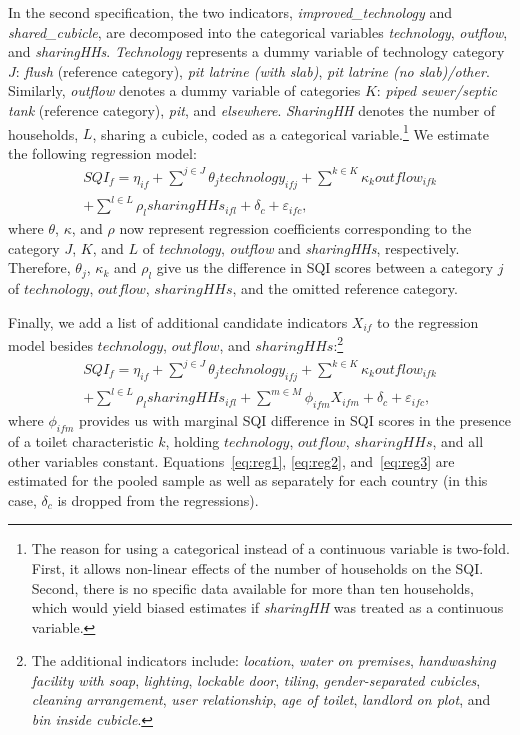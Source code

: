 \documentclass[natbib]{svjour3}                     %
\begin{document}
In the second specification, the two indicators, \textit{improved\_technology} and \textit{shared\_cubicle}, are decomposed into the categorical variables \textit{technology}, \textit{outflow}, and \textit{sharingHHs}. \textit{Technology} represents a dummy variable of technology category $J$: \textit{flush} (reference category), \textit{pit latrine (with slab)}, \textit{pit latrine (no slab)/other}. Similarly, \textit{outflow} denotes a dummy variable of categories $K$: \textit{piped sewer/septic tank} (reference category), \textit{pit}, and \textit{elsewhere}. \textit{SharingHH} denotes the number of households, $L$, sharing a cubicle, coded as a categorical variable.\footnote{The reason for using a categorical instead of a continuous variable is two-fold. First, it allows non-linear effects of the number of households on the SQI. Second, there is no specific data available for more than ten households, which would yield biased estimates if \textit{sharingHH} was treated as a continuous variable.} We estimate the following regression model:
\begin{multline}
\label{eq:reg2}
    SQI_{f} = \eta_{if} + \sum^{j\in J}\theta_{j} technology_{ifj} + \sum^{k\in K} \kappa_{k} outflow_{ifk} \\ 
    + \sum^{l\in L} \rho_{l} sharingHHs_{ifl} + \delta_c +\varepsilon_{ifc},
\end{multline}
where $\theta$, $\kappa$, and $\rho$ now represent regression coefficients corresponding to the category $J$, $K$, and $L$ of \textit{technology}, \textit{outflow} and \textit{sharingHHs}, respectively. Therefore, $\theta_{j}$, $\kappa_{k}$ and $\rho_{l}$ give us the difference in SQI scores between a category $j$ of $technology$, $outflow$, $sharingHHs$, and the omitted reference category. 

Finally, we add a list of additional candidate indicators $X_{if}$ to the regression model besides $technology$, $outflow$, and $sharingHHs$:\footnote{The additional indicators include: \textit{location}, \textit{water on premises}, \textit{handwashing facility with soap}, \textit{lighting}, \textit{lockable door}, \textit{tiling}, \textit{gender-separated cubicles}, \textit{cleaning arrangement}, \textit{user relationship}, \textit{age of toilet}, \textit{landlord on plot}, and \textit{bin inside cubicle}.}
\begin{multline}
\label{eq:reg3}
 SQI_{f} = \eta_{if} + \sum^{j\in J}\theta_{j} technology_{ifj} + \sum^{k\in K} \kappa_{k} outflow_{ifk} \\ 
    + \sum^{l\in L} \rho_{l} sharingHHs_{ifl} + \sum^{m \in M} \phi_{ifm} X_{ifm} + \delta_c +\varepsilon_{ifc},
\end{multline}
where $\phi_{ifm}$ provides us with marginal SQI difference in SQI scores in the presence of a toilet characteristic $k$, holding $technology$, $outflow$, $sharingHHs$, and all other variables constant. Equations~\ref{eq:reg1}, \ref{eq:reg2}, and~\ref{eq:reg3} are estimated for the pooled sample as well as separately for each country (in this case, $\delta_c$ is dropped from the regressions).
\end{document}
